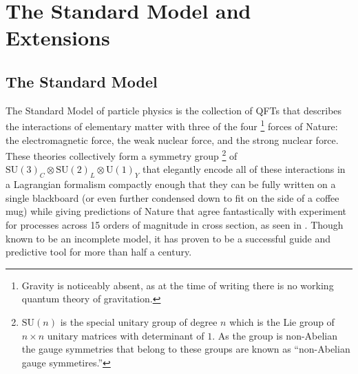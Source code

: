 \chapter{The Standard Model and Extensions}\label{chapter:theory}

\section{The Standard Model}\label{section:standard_model}

The Standard Model of particle physics is the collection of \glspl{QFT} that describes the interactions of elementary matter with three of the four%
\footnote{Gravity is noticeably absent, as at the time of writing there is no working quantum theory of gravitation.}
forces of Nature: the electromagnetic force, the weak nuclear force, and the strong nuclear force.
These theories collectively form a symmetry group%
\footnote{$\mathrm{SU}(n)$ is the special unitary group of degree $n$ which is the Lie group  of $n\times n$ unitary matrices with determinant of $1$.
 As the group is non-Abelian the gauge symmetries that belong to these groups are known as ``non-Abelian gauge symmetires.''}
of $\mathrm{SU}(3)_{C} \otimes \mathrm{SU}(2)_{L} \otimes \mathrm{U}(1)_{Y}$ that elegantly encode all of these interactions in a Lagrangian formalism compactly enough that they can be fully written on a single blackboard (or even further condensed down to fit on the side of a coffee mug) while giving predictions of Nature that agree fantastically with experiment for processes across 15 orders of magnitude in cross section, as seen in .
Though known to be an incomplete model, it has proven to be a successful guide and predictive tool for more than half a century.

